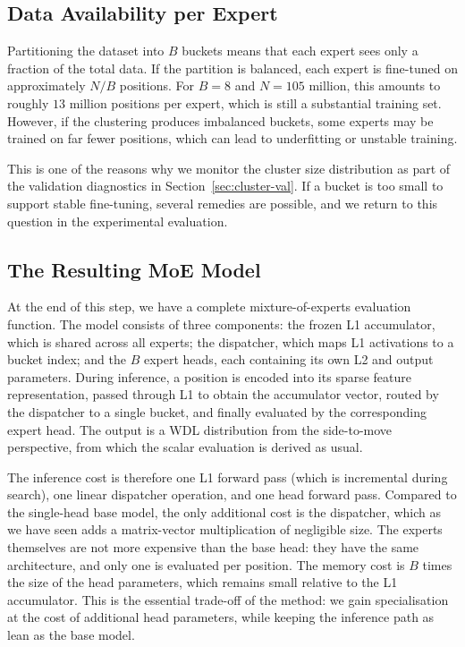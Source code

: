 \subsection{Data Availability per Expert}\label{sec:expert-data}

Partitioning the dataset into \(B\) buckets means that each expert sees only a fraction of the total data. If the partition is balanced, each expert is fine-tuned on approximately \(N/B\) positions. For \(B=8\) and \(N=105\) million, this amounts to roughly \(13\) million positions per expert, which is still a substantial training set. However, if the clustering produces imbalanced buckets, some experts may be trained on far fewer positions, which can lead to underfitting or unstable training.

This is one of the reasons why we monitor the cluster size distribution as part of the validation diagnostics in Section~\ref{sec:cluster-val}. If a bucket is too small to support stable fine-tuning, several remedies are possible, and we return to this question in the experimental evaluation.

\subsection{The Resulting MoE Model}\label{sec:method-moe}

At the end of this step, we have a complete mixture-of-experts evaluation function. The model consists of three components: the frozen L1 accumulator, which is shared across all experts; the dispatcher, which maps L1 activations to a bucket index; and the \(B\) expert heads, each containing its own L2 and output parameters. During inference, a position is encoded into its sparse feature representation, passed through L1 to obtain the accumulator vector, routed by the dispatcher to a single bucket, and finally evaluated by the corresponding expert head. The output is a WDL distribution from the side-to-move perspective, from which the scalar evaluation is derived as usual.

The inference cost is therefore one L1 forward pass (which is incremental during search), one linear dispatcher operation, and one head forward pass. Compared to the single-head base model, the only additional cost is the dispatcher, which as we have seen adds a matrix-vector multiplication of negligible size. The experts themselves are not more expensive than the base head: they have the same architecture, and only one is evaluated per position. The memory cost is \(B\) times the size of the head parameters, which remains small relative to the L1 accumulator. This is the essential trade-off of the method: we gain specialisation at the cost of additional head parameters, while keeping the inference path as lean as the base model.

